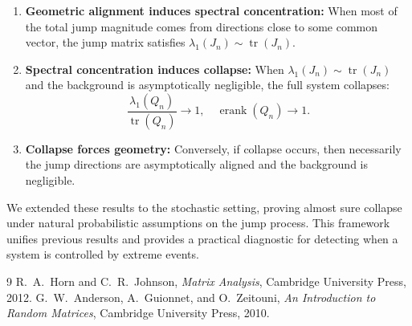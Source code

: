 \documentclass{article}
\begin{document}
\begin{enumerate}
\item \textbf{Geometric alignment induces spectral concentration:} When most of the total jump magnitude comes from directions close to some common vector, the jump matrix satisfies \(\lambda_1(J_n) \sim \operatorname{tr}(J_n)\).

\item \textbf{Spectral concentration induces collapse:} When \(\lambda_1(J_n) \sim \operatorname{tr}(J_n)\) and the background is asymptotically negligible, the full system collapses:
\[
\frac{\lambda_1(Q_n)}{\operatorname{tr}(Q_n)} \to 1, \quad \operatorname{erank}(Q_n) \to 1.
\]

\item \textbf{Collapse forces geometry:} Conversely, if collapse occurs, then necessarily the jump directions are asymptotically aligned and the background is negligible.
\end{enumerate}

We extended these results to the stochastic setting, proving almost sure collapse under natural probabilistic assumptions on the jump process. This framework unifies previous results and provides a practical diagnostic for detecting when a system is controlled by extreme events.

\begin{thebibliography}{9}
 R.\ A.\ Horn and C.\ R.\ Johnson, \textit{Matrix Analysis}, Cambridge University Press, 2012.
 G.\ W.\ Anderson, A.\ Guionnet, and O.\ Zeitouni, \textit{An Introduction to Random Matrices}, Cambridge University Press, 2010.
\end{thebibliography}
 
\end{document}
